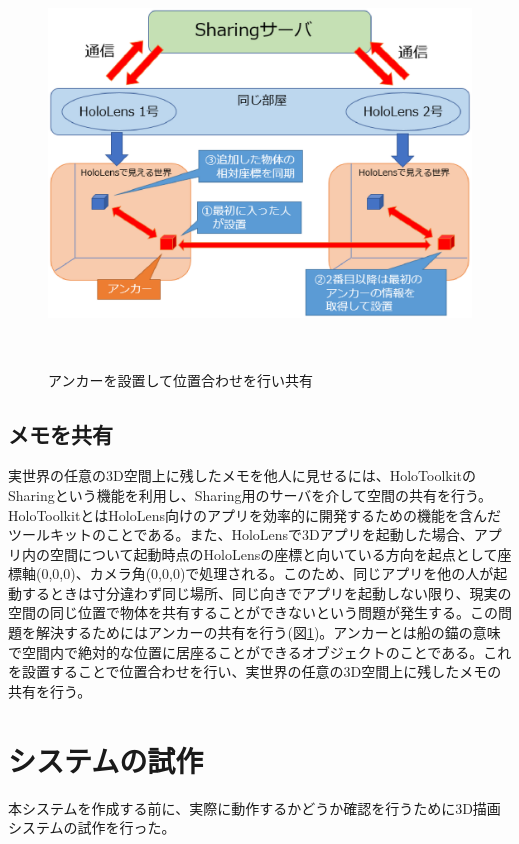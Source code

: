 \documentclass{hissymp}
\begin{document}
\begin{figure}[t]
  \begin{center}
    \includegraphics[clip,height=10.0cm,width=14.0cm]{./sharing.eps}
    \caption{アンカーを設置して位置合わせを行い共有}
    \label{fig:sharing}
  \end{center}
\end{figure}

\subsection{メモを共有}
実世界の任意の3D空間上に残したメモを他人に見せるには、HoloToolkit\cite{tex7}のSharing\cite{tex8}という機能を利用し、Sharing用のサーバを介して空間の共有を行う。HoloToolkitとはHoloLens向けのアプリを効率的に開発するための機能を含んだツールキットのことである。また、HoloLensで3Dアプリを起動した場合、アプリ内の空間について起動時点のHoloLensの座標と向いている方向を起点として座標軸(0,0,0)、カメラ角(0,0,0)で処理される。このため、同じアプリを他の人が起動するときは寸分違わず同じ場所、同じ向きでアプリを起動しない限り、現実の空間の同じ位置で物体を共有することができないという問題が発生する。この問題を解決するためにはアンカーの共有を行う(図\ref{fig:sharing})。アンカーとは船の錨の意味で空間内で絶対的な位置に居座ることができるオブジェクトのことである。これを設置することで位置合わせを行い、実世界の任意の3D空間上に残したメモの共有を行う。

\section{システムの試作}
本システムを作成する前に、実際に動作するかどうか確認を行うために3D描画システムの試作を行った。
\end{document}

